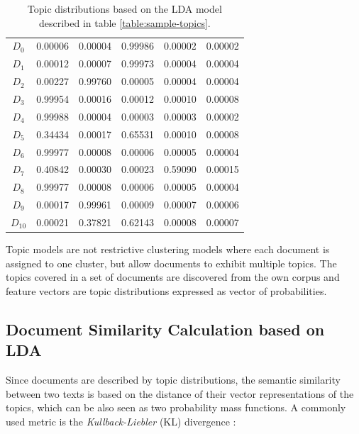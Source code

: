 \begin{table}[!htbp]
\centering%
\begin{tabularx}{\linewidth}{CCCCCC}
\toprule
{} &  &  &  &  &  \\
\midrule
\midrule
$D_0$ & 0.00006 & 0.00004 & 0.99986 & 0.00002 & 0.00002\\
\midrule
$D_1$ & 0.00012 & 0.00007 & 0.99973 & 0.00004 & 0.00004 \\
\midrule
$D_2$ & 0.00227 & 0.99760  & 0.00005 & 0.00004 & 0.00004\\
\midrule
$D_3$ & 0.99954 & 0.00016 & 0.00012 & 0.00010 & 0.00008 \\
\midrule
$D_4$ & 0.99988 & 0.00004 & 0.00003 & 0.00003 & 0.00002\\
\midrule
$D_5$ & 0.34434 & 0.00017 & 0.65531 & 0.00010 & 0.00008\\
\midrule
$D_6$ & 0.99977 & 0.00008 & 0.00006 & 0.00005 & 0.00004\\
\midrule
$D_7$ & 0.40842 & 0.00030 & 0.00023 & 0.59090 & 0.00015\\
\midrule
$D_8$ & 0.99977 & 0.00008 & 0.00006 & 0.00005 & 0.00004\\
\midrule
$D_9$ & 0.00017 & 0.99961 & 0.00009 & 0.00007 & 0.00006\\
\midrule
$D_{10}$ & 0.00021 & 0.37821 & 0.62143 & 0.00008 & 0.00007\\
\midrule
\bottomrule
\end{tabularx}
\caption{Topic distributions based on the LDA model described in table \ref{table:sample-topics}.}
\label{table:sample-doctopics}
\end{table}


Topic models are not restrictive clustering models where each document is assigned to one cluster, but allow documents to exhibit multiple topics. The topics covered in a set of documents are discovered from the own corpus and feature vectors are topic distributions expressed as vector of probabilities.


\subsection{Document Similarity Calculation based on LDA}\label{sec:doc-sim-lda}

Since documents are described by topic distributions, the semantic similarity between two texts is based on the distance of their vector representations of the topics, which can be also seen as two probability mass functions. A commonly used metric is the \textit{Kullback-Liebler} (KL) divergence \citep{Kullback1951, Kullback1968}:

